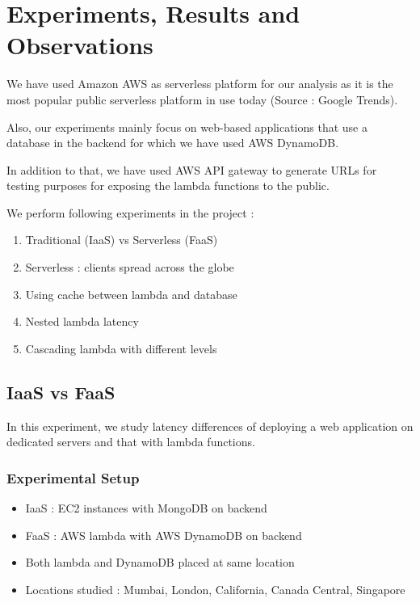 
\chapter{Experiments, Results and Observations} %

\label{Chapter 5} %


We have used Amazon AWS as serverless platform for our analysis as it is the most popular public serverless platform in use today (Source : Google Trends).

Also, our experiments mainly focus on web-based applications that use a database in the backend for which we have used AWS DynamoDB.

In addition to that, we have used AWS API gateway to generate URLs for testing purposes for exposing the lambda functions to the public.

We perform following experiments in the project :

\begin{enumerate}
    \item Traditional (IaaS) vs Serverless (FaaS)
    \item Serverless : clients spread across the globe
    \item Using cache between lambda and database
    \item Nested lambda latency
    \item Cascading lambda with different levels
\end{enumerate}

\section{IaaS vs FaaS}

In this experiment, we study latency differences of deploying a web application on dedicated servers and that with lambda functions.

\subsection{Experimental Setup}
\begin{itemize}
    \item IaaS : EC2 instances with MongoDB on backend
    \item FaaS : AWS lambda with AWS DynamoDB on backend
    \item Both lambda and DynamoDB placed at same location
    \item Locations studied : Mumbai, London, California, Canada Central, Singapore
\end{itemize}

